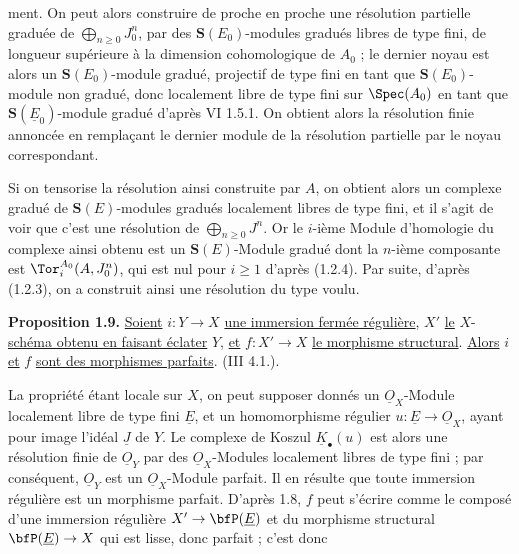 
ment. On peut alors construire de proche en proche une résolution partielle graduée de \(\bigoplus_{n\ge0}J_0^n\), par des \(\mathbf{S}(E_0)\)-modules gradués libres de type fini, de longueur supérieure à la dimension cohomologique de \(A_0\) ; le dernier noyau est alors un \(\mathbf{S}(E_0)\)-module gradué, projectif de type fini en tant que \(\mathbf{S}(E_0)\)-module non gradué, donc localement libre de type fini sur \(\Spec(A_0)\) en tant que \(\mathbf{S}(\underline{E}_0)\)-module gradué d'après VI 1.5.1. On obtient alors la résolution finie annoncée en remplaçant le dernier module de la résolution partielle par le noyau correspondant.

Si on tensorise la résolution ainsi construite par \(A\), on obtient alors un complexe gradué de \(\mathbf{S}(E)\)-modules gradués localement libres de type fini, et il s'agit de voir que c'est une résolution de \(\bigoplus_{n\ge0}J^n\). Or le \(i\)-ième Module d'homologie du complexe ainsi obtenu est un \(\mathbf{S}(E)\)-Module gradué dont la \(n\)-ième composante est \(\Tor_i^{A_0}(A,J_0^n)\), qui est nul pour \(i\ge1\) d'après (1.2.4). Par suite, d'après (1.2.3), on a construit ainsi une résolution du type voulu.

\textbf{Proposition 1.9.} \uline{Soient} \(i:Y\to X\) \uline{une immersion fermée régulière}, \(X'\) \uline{le} \(X\)-\uline{schéma obtenu en faisant éclater} \(Y\), \uline{et} \(f:X'\to X\) \uline{le morphisme structural}. \uline{Alors} \(i\) \uline{et} \(f\) \uline{sont des morphismes parfaits}. (III 4.1.).

La propriété étant locale sur \(X\), on peut supposer donnés un \(\underline{O}_X\)-Module localement libre de type fini \(\underline{E}\), et un homomorphisme régulier \(u:\underline{E}\to\underline{O}_X\), ayant pour image l'idéal \(\underline{J}\) de \(Y\). Le complexe de Koszul \(\underline{K}_\bullet(u)\) est alors une résolution finie de \(\underline{O}_Y\) par des \(\underline{O}_X\)-Modules localement libres de type fini ; par conséquent, \(\underline{O}_Y\) est un \(\underline{O}_X\)-Module parfait. Il en résulte que toute immersion régulière est un morphisme parfait. D'après 1.8, \(f\) peut s'écrire comme le composé d'une immersion régulière \(X'\to\bfP(\underline{E})\) et du morphisme structural \(\bfP(\underline{E})\to X\) qui est lisse, donc parfait ; c'est donc
